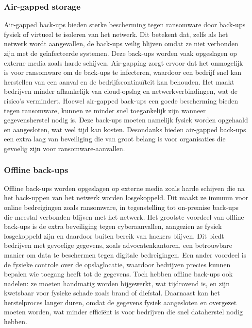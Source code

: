\subsubsection{Air-gapped storage}
Air-gapped back-ups bieden sterke bescherming tegen ransomware door back-ups fysiek of virtueel te isoleren van het netwerk. Dit betekent dat, zelfs als het netwerk wordt aangevallen, de back-ups veilig blijven omdat ze niet verbonden zijn met de geïnfecteerde systemen. Deze back-ups worden vaak opgeslagen op externe media zoals harde schijven\autocite{Bryant2015}. Air-gapping zorgt ervoor dat het onmogelijk is voor ransomware om de back-ups te infecteren, waardoor een bedrijf snel kan herstellen van een aanval en de bedrijfscontinuïteit kan behouden. Het maakt bedrijven minder afhankelijk van cloud-opslag en netwerkverbindingen, wat de risico’s vermindert. Hoewel air-gapped back-ups een goede bescherming bieden tegen ransomware, kunnen ze minder snel toegankelijk zijn wanneer gegevensherstel nodig is. Deze back-ups moeten namelijk fysiek worden opgehaald en aangesloten, wat veel tijd kan kosten. Desondanks bieden air-gapped back-ups een extra laag van beveiliging die van groot belang is voor organisaties die gevoelig zijn voor ransomware-aanvallen\autocite{Park2023}.
\subsubsection{Offline back-ups}
Offline back-ups worden opgeslagen op externe media zoals harde schijven die na het back-uppen van het netwerk worden losgekoppeld\autocite{Edwards2022}. Dit maakt ze immuun voor online bedreigingen zoals ransomware, in tegenstelling tot on-premise back-ups die meestal verbonden blijven met het netwerk. Het grootste voordeel van offline back-ups is de extra beveiliging tegen cyberaanvallen, aangezien ze fysiek losgekoppeld zijn en daardoor buiten bereik van hackers blijven. Dit biedt bedrijven met gevoelige gegevens, zoals advocatenkantoren, een betrouwbare manier om data te beschermen tegen digitale bedreigingen. Een ander voordeel is de fysieke controle over de opslaglocatie, waardoor bedrijven precies kunnen bepalen wie toegang heeft tot de gegevens. Toch hebben offline back-ups ook nadelen: ze moeten handmatig worden bijgewerkt, wat tijdrovend is, en zijn kwetsbaar voor fysieke schade zoals brand of diefstal. Daarnaast kan het herstelproces langer duren, omdat de gegevens fysiek aangesloten en overgezet moeten worden, wat minder efficiënt is voor bedrijven die snel dataherstel nodig hebben\autocite{James2019}.